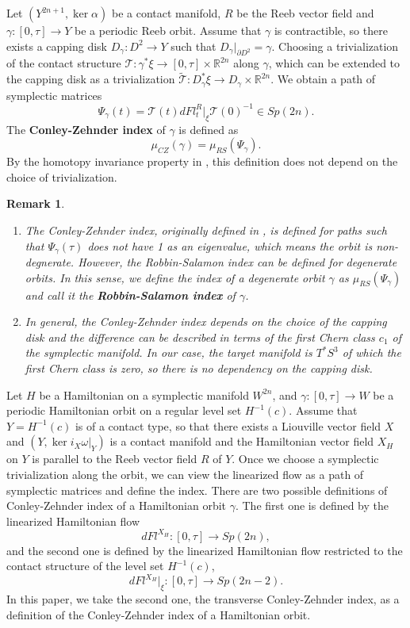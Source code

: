 \documentclass{amsart}
\newcommand{\R}{\mathbb{R}}
\renewcommand{\o}{\omega}
\newcommand{\g}{\gamma}
\newcommand{\pp}{\partial}
\newtheorem{remark}[thm]{Remark}
\begin{document}
Let $(Y^{2n+1},\ker\alpha)$ be a contact manifold, $R$ be the Reeb vector field and $\g:[0,\tau]\to Y$ be a periodic Reeb orbit.
Assume that $\g$ is contractible, so there exists a capping disk $D_\g:D^2\to Y$ such that $D_\g|_{\pp D^2} = \g$.
Choosing a trivialization of the contact structure $\mathcal{T}:\g^*\xi\to[0,\tau]\times \R^{2n}$ along $\g$, which can be extended to the capping disk as a trivialization $\tilde{\mathcal{T}}:D_\g^*\xi\to D_\g\times\R^{2n}$.
We obtain a path of symplectic matrices
$$\Psi_\g(t) = \mathcal{T}(t) dFl^R_t|_\xi \mathcal{T}(0)^{-1}\in Sp(2n).$$
The \textbf{Conley-Zehnder index} of $\g$ is defined as
$$\mu_{CZ}(\g) = \mu_{RS}(\Psi_\g).$$
By the homotopy invariance property in , this definition does not depend on the choice of trivialization.
\begin{remark}\rm
	\begin{enumerate}
		\item The Conley-Zehnder index, originally defined in \cite{Conley_Zehnder_83}, is defined for paths such that $\Psi_\g(\tau)$ does not have 1 as an eigenvalue, which means the orbit is non-degnerate.
		However, the Robbin-Salamon index can be defined for degenerate orbits.
		In this sense, we define the index of a degenerate orbit $\g$ as $\mu_{RS}(\Psi_\g)$ and call it the \textbf{Robbin-Salamon index} of $\g$.
		\item In general, the Conley-Zehnder index depends on the choice of the capping disk and the difference can be described in terms of the first Chern class $c_1$ of the symplectic manifold.
		In our case, the target manifold is $T^*S^3$ of which the first Chern class is zero, so there is no dependency on the capping disk.
	\end{enumerate}
\end{remark}

Let $H$ be a Hamiltonian on a symplectic manifold $W^{2n}$, and $\g:[0,\tau]\to W$ be a periodic Hamiltonian orbit on a regular level set $H^{-1}(c)$.
Assume that $Y=H^{-1}(c)$ is of a contact type, so that there exists a Liouville vector field $X$ and $(Y,\ker i_X\o|_Y)$ is a contact manifold and the Hamiltonian vector field $X_H$ on $Y$ is parallel to the Reeb vector field $R$ of $Y$.
Once we choose a symplectic trivialization along the orbit, we can view the linearized flow as a path of symplectic matrices and define the index.
There are two possible definitions of Conley-Zehnder index of a Hamiltonian orbit $\g$.
The first one is defined by the linearized Hamiltonian flow
$$dFl^{X_H}:[0,\tau]\to Sp(2n),$$
and the second one is defined by the linearized Hamiltonian flow restricted to the contact structure of the level set $H^{-1}(c)$,
$$
dFl^{X_H}|_{\xi}:[0,\tau]\to Sp(2n-2).
$$
In this paper, we take the second one, the transverse Conley-Zehnder index, as a definition of the Conley-Zehnder index of a Hamiltonian orbit.
\end{document}
